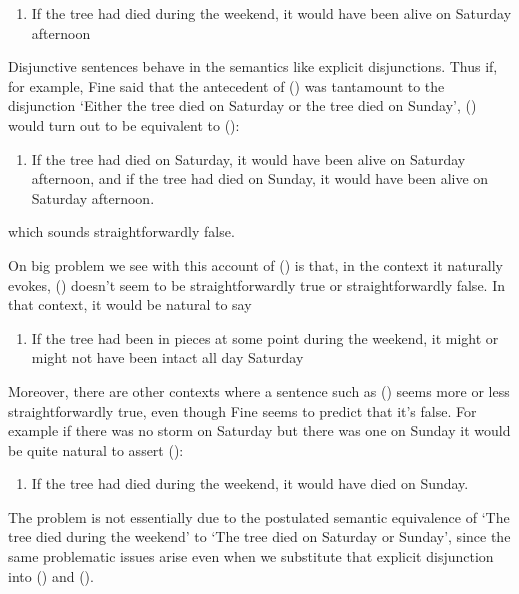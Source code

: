 \begin{enumerate}
\def\labelenumi{(\arabic{enumi})}
\setcounter{enumi}{61}
\itemsep1pt\parskip0pt
\item
  If the tree had died during the weekend, it would have been alive on
  Saturday afternoon
\end{enumerate}

Disjunctive sentences behave in the semantics like explicit
disjunctions. Thus if, for example, Fine said that the antecedent of ()
was tantamount to the disjunction `Either the tree died on Saturday or
the tree died on Sunday', () would turn out to be equivalent to ():

\begin{enumerate}
\def\labelenumi{(\arabic{enumi})}
\setcounter{enumi}{62}
\itemsep1pt\parskip0pt
\item
  If the tree had died on Saturday, it would have been alive on Saturday
  afternoon, and if the tree had died on Sunday, it would have been
  alive on Saturday afternoon.
\end{enumerate}

which sounds straightforwardly false.

On big problem we see with this account of () is that, in the context it
naturally evokes, () doesn't seem to be straightforwardly true or
straightforwardly false. In that context, it would be natural to say

\begin{enumerate}
\def\labelenumi{(\arabic{enumi})}
\setcounter{enumi}{63}
\itemsep1pt\parskip0pt
\item
  If the tree had been in pieces at some point during the weekend, it
  might or might not have been intact all day Saturday
\end{enumerate}

Moreover, there are other contexts where a sentence such as () seems
more or less straightforwardly true, even though Fine seems to predict
that it's false. For example if there was no storm on Saturday but there
was one on Sunday it would be quite natural to assert ():

\begin{enumerate}
\def\labelenumi{(\arabic{enumi})}
\setcounter{enumi}{64}
\itemsep1pt\parskip0pt
\item
  If the tree had died during the weekend, it would have died on Sunday.
\end{enumerate}

The problem is not essentially due to the postulated semantic
equivalence of `The tree died during the weekend' to `The tree died on
Saturday or Sunday', since the same problematic issues arise even when
we substitute that explicit disjunction into () and ().

